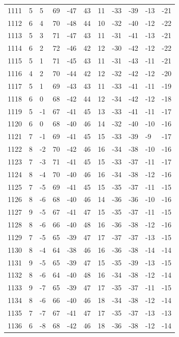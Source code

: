 \begin{table}[H]
\begin{tabular}{lllllllllll}
1111 & 5 & 5 & 69 & -47 & 43 & 11 & -33 & -39 & -13 & -21 \\
1112 & 6 & 4 & 70 & -48 & 44 & 10 & -32 & -40 & -12 & -22 \\
1113 & 5 & 3 & 71 & -47 & 43 & 11 & -31 & -41 & -13 & -21 \\
1114 & 6 & 2 & 72 & -46 & 42 & 12 & -30 & -42 & -12 & -22 \\
1115 & 5 & 1 & 71 & -45 & 43 & 11 & -31 & -43 & -11 & -21 \\
1116 & 4 & 2 & 70 & -44 & 42 & 12 & -32 & -42 & -12 & -20 \\
1117 & 5 & 1 & 69 & -43 & 43 & 11 & -33 & -41 & -11 & -19 \\
1118 & 6 & 0 & 68 & -42 & 44 & 12 & -34 & -42 & -12 & -18 \\
1119 & 5 & -1 & 67 & -41 & 45 & 13 & -33 & -41 & -11 & -17 \\
1120 & 6 & 0 & 68 & -40 & 46 & 14 & -32 & -40 & -10 & -16 \\
1121 & 7 & -1 & 69 & -41 & 45 & 15 & -33 & -39 & -9 & -17 \\
1122 & 8 & -2 & 70 & -42 & 46 & 16 & -34 & -38 & -10 & -16 \\
1123 & 7 & -3 & 71 & -41 & 45 & 15 & -33 & -37 & -11 & -17 \\
1124 & 8 & -4 & 70 & -40 & 46 & 16 & -34 & -38 & -12 & -16 \\
1125 & 7 & -5 & 69 & -41 & 45 & 15 & -35 & -37 & -11 & -15 \\
1126 & 8 & -6 & 68 & -40 & 46 & 14 & -36 & -36 & -10 & -16 \\
1127 & 9 & -5 & 67 & -41 & 47 & 15 & -35 & -37 & -11 & -15 \\
1128 & 8 & -6 & 66 & -40 & 48 & 16 & -36 & -38 & -12 & -16 \\
1129 & 7 & -5 & 65 & -39 & 47 & 17 & -37 & -37 & -13 & -15 \\
1130 & 8 & -4 & 64 & -38 & 46 & 16 & -36 & -38 & -14 & -14 \\
1131 & 9 & -5 & 65 & -39 & 47 & 15 & -35 & -39 & -13 & -15 \\
1132 & 8 & -6 & 64 & -40 & 48 & 16 & -34 & -38 & -12 & -14 \\
1133 & 9 & -7 & 65 & -39 & 47 & 17 & -35 & -37 & -11 & -15 \\
1134 & 8 & -6 & 66 & -40 & 46 & 18 & -34 & -38 & -12 & -14 \\
1135 & 7 & -7 & 67 & -41 & 47 & 17 & -35 & -37 & -13 & -13 \\
1136 & 6 & -8 & 68 & -42 & 46 & 18 & -36 & -38 & -12 & -14 \\

\end{tabular}
\end{table}
